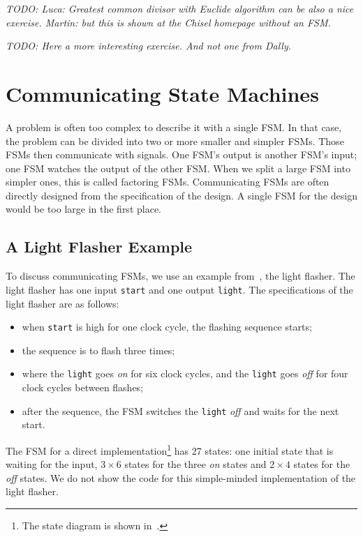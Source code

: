 \documentclass[%
    10pt,
    headinclude, footinclude=false,
    openright, %
    notitlepage,
    cleardoublepage=empty,
    headsepline,
    numbers=noenddot,
    bibliography=totoc, index=totoc,
    ]{scrbook}
\newcommand{\code}[1]{{\lstinline[basicstyle=\small\ttfamily]{#1}}}
\newcommand{\todo}[1]{{\emph{TODO: #1}}}
\begin{document}
\todo{Luca: Greatest common divisor with Euclide algorithm can be also a nice exercise.
Martin: but this is shown at the Chisel homepage without an FSM.}

\todo{Here a more interesting exercise. And not one from Dally.}

\chapter{Communicating State Machines}

A problem is often too complex to describe it with a single FSM.
In that case, the problem can be divided into two or more smaller and simpler FSMs.
Those FSMs then communicate with signals. One FSM's output is
another FSM's input; one FSM watches the output of the other FSM.
When we split a large FSM into simpler ones, this is called factoring FSMs.
Communicating FSMs are often directly designed from the specification
of the design. A single FSM for the design would be too large in the first place.

\section{A Light Flasher Example}

To discuss communicating FSMs, we use an example
from~\cite[Chapter~17]{dally:vhdl:2016}, the light flasher.
The light flasher has one input \code{start} and one output
\code{light}. The specifications of the light flasher are as follows:
\begin{itemize}
\item when \code{start} is high for one clock cycle, the flashing
sequence starts;
\item the sequence is to flash three times;
\item where the \code{light} goes \emph{on} for six clock cycles, and the \code{light} goes \emph{off} for four clock cycles between flashes;
\item after the sequence, the FSM switches the \code{light} \emph{off} and waits
for the next start.
\end{itemize}

The FSM for a direct implementation\footnote{The state diagram is shown
in~\cite[p.~376]{dally:vhdl:2016}.} has 27 states:
one initial state that is waiting for the input, $3 \times 6$ states for the three
\emph{on} states and $2 \times 4$ states for the \emph{off} states.
We do not show the code for this simple-minded implementation of the light
flasher.
\end{document}
